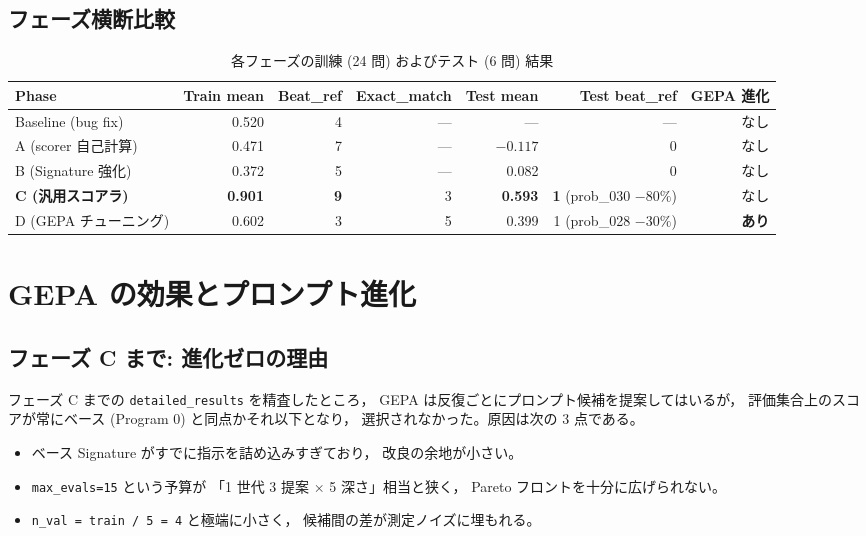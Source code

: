 \documentclass[uplatex,dvipdfmx,a4paper,11pt]{jsarticle}
\begin{document}
\subsection{フェーズ横断比較}

\begin{table}[htbp]
\centering\footnotesize
\caption{各フェーズの訓練 (24 問) およびテスト (6 問) 結果}
\label{tab:phase}
\begin{tabular}{@{}lrrrrrr@{}}
\toprule
Phase & Train mean & Beat\_ref & Exact\_match & Test mean & Test beat\_ref & GEPA 進化 \\
\midrule
Baseline (bug fix) & 0.520 & 4 & --- & --- & --- & なし \\
A (scorer 自己計算)   & 0.471 & 7 & --- & $-0.117$ & 0 & なし \\
B (Signature 強化)    & 0.372 & 5 & --- & 0.082    & 0 & なし \\
\textbf{C (汎用スコアラ)} & \textbf{0.901} & \textbf{9} & 3 & \textbf{0.593} & \textbf{1} (prob\_030 $-80\%$) & なし \\
D (GEPA チューニング) & 0.602 & 3 & 5 & 0.399    & 1 (prob\_028 $-30\%$) & \textbf{あり} \\
\bottomrule
\end{tabular}
\end{table}

\section{GEPA の効果とプロンプト進化}\label{sec:gepa}

\subsection{フェーズ C まで: 進化ゼロの理由}

フェーズ C までの \texttt{detailed\_results} を精査したところ，
GEPA は反復ごとにプロンプト候補を提案してはいるが，
評価集合上のスコアが常にベース (Program 0) と同点かそれ以下となり，
選択されなかった。原因は次の 3 点である。

\begin{itemize}
  \item ベース Signature がすでに指示を詰め込みすぎており，
    改良の余地が小さい。
  \item \texttt{max\_evals=15} という予算が
    「1 世代 3 提案 $\times$ 5 深さ」相当と狭く，
    Pareto フロントを十分に広げられない。
  \item \texttt{n\_val = train / 5 = 4} と極端に小さく，
    候補間の差が測定ノイズに埋もれる。
\end{itemize}
\end{document}
